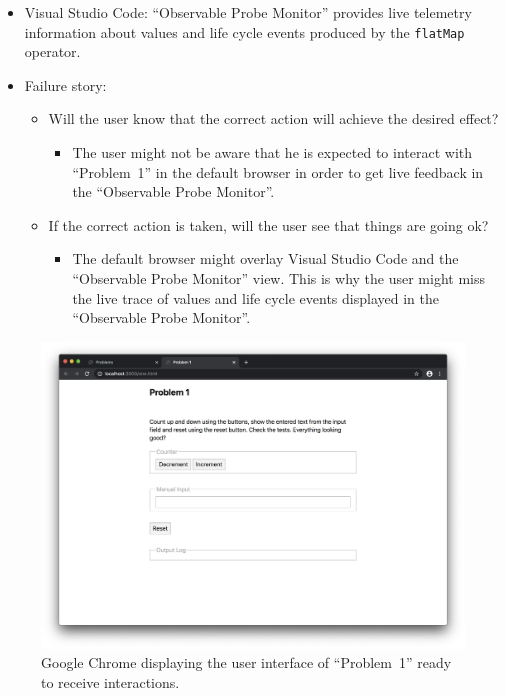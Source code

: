 \documentclass[sigplan,screen,nonacm,review]{acmart}
\begin{document}
\begin{itemize}
	\item Visual Studio Code: ``Observable Probe Monitor'' provides live telemetry information about values and life cycle events produced by the \texttt{flatMap} operator.
	\item Failure story:
	      \begin{itemize}
	      	\item Will the user know that the correct action will achieve the desired effect?
	      	      \begin{itemize}
	      	      	\item The user might not be aware that he is expected to interact with ``Problem~1'' in the default browser in order to get live feedback in the ``Observable Probe Monitor''.
	      	      \end{itemize}
	      	\item If the correct action is taken, will the user see that things are going ok?
	      	      \begin{itemize}
	      	      	\item The default browser might overlay Visual Studio Code and the ``Observable Probe Monitor'' view. This is why the user might miss the live trace of values and life cycle events displayed in the ``Observable Probe Monitor''.
	      	      \end{itemize}
	      \end{itemize}
\end{itemize}

\begin{figure}[ht]
	\centering
	\includegraphics[width=\columnwidth]{walkthrough-screenshots/step7.png}
	\Description{}
	\caption{Google Chrome displaying the user interface of ``Problem~1'' ready to receive interactions.}
	\label{fig:walkthrough-screesnhot-step-7}
\end{figure}
\end{document}
